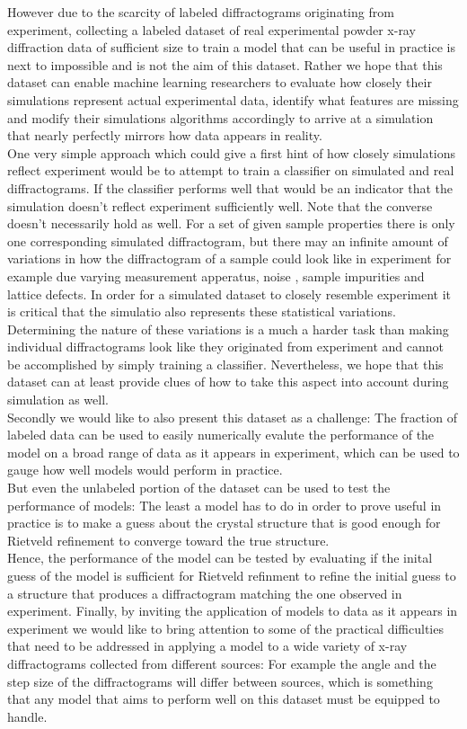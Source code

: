 However due to the scarcity of labeled diffractograms originating from experiment, collecting a labeled dataset
of real experimental powder x-ray diffraction data of sufficient size to train a model
that can be useful in practice is next to impossible and is not the aim of this dataset.
Rather we hope that this dataset can enable machine learning researchers to evaluate how closely their simulations
represent actual experimental data, identify what features are missing and modify their simulations algorithms
accordingly to arrive at a simulation that nearly perfectly mirrors how data appears in reality.\\
One very simple approach which could give a first hint of how closely simulations reflect experiment would be to attempt
to train a classifier on simulated and real diffractograms.
If the classifier performs well that would be an indicator that the simulation doesn't reflect experiment sufficiently well.
Note that the converse doesn't necessarily hold as well.
For a set of given sample properties there is only one corresponding simulated diffractogram, but there may an infinite amount of
variations in how the diffractogram of a sample could look like in experiment for example due varying measurement apperatus, noise
, sample impurities and lattice defects.
In order for a simulated dataset to closely resemble experiment it is critical that the simulatio also represents these
statistical variations.
Determining the nature of these variations is a much a harder task than making individual diffractograms look like they
originated from experiment and cannot be accomplished by simply training a classifier.
Nevertheless, we hope that this dataset can at least provide clues of how to take this aspect into account during
simulation as well.\\

Secondly we would like to also present this dataset as a challenge: The fraction of labeled data can be used to
easily numerically evalute the performance of the model on a broad range of data as it appears in experiment, which can be used
to gauge how well models would perform in practice. \\
But even the unlabeled portion of the dataset can be used to test the performance of models: The least a model
has to do in order to prove useful in practice is to make a guess about the crystal structure that is good enough
for Rietveld refinement to converge toward the true structure. \\
Hence, the performance of the model can be tested by evaluating if the inital guess of the model is sufficient for
Rietveld refinment to refine the initial guess to a structure that produces a diffractogram matching the one observed in experiment.
Finally, by inviting the application of models to data as it appears in experiment we would like to bring attention
to some of the practical difficulties that need to be addressed in applying a model to a wide variety of x-ray diffractograms
collected from different sources: For example the angle and the step size of the diffractograms will differ between sources, 
which is something that any model that aims to perform well on this dataset must be equipped to handle.

